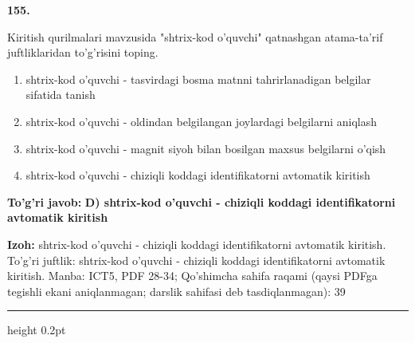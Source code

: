 \documentclass[10pt,a4paper]{article}
\begin{document}
{\bfseries\sffamily\color{ink} 155.}
\par
Kiritish qurilmalari mavzusida "shtrix-kod o'quvchi" qatnashgan atama-ta'rif juftliklaridan to'g'risini toping.
\begin{enumerate}[label=\Alph*),leftmargin=9mm]
\item shtrix-kod o'quvchi - tasvirdagi bosma matnni tahrirlanadigan belgilar sifatida tanish
\item shtrix-kod o'quvchi - oldindan belgilangan joylardagi belgilarni aniqlash
\item shtrix-kod o'quvchi - magnit siyoh bilan bosilgan maxsus belgilarni o'qish
\item shtrix-kod o'quvchi - chiziqli koddagi identifikatorni avtomatik kiritish
\end{enumerate}
\begin{tcolorbox}[enhanced,breakable,colback=teal!4,colframe=teal!60!black,boxrule=0.45pt,arc=1.2mm,left=2.7mm,right=2.7mm,top=1.8mm,bottom=1.8mm,before skip=2mm,after skip=2mm]
{\bfseries\sffamily\color{teal}To'g'ri javob:} \textbf{D) shtrix-kod o'quvchi - chiziqli koddagi identifikatorni avtomatik kiritish}
\par\smallskip
{\bfseries Izoh:} shtrix-kod o'quvchi - chiziqli koddagi identifikatorni avtomatik kiritish. To'g'ri juftlik: shtrix-kod o'quvchi - chiziqli koddagi identifikatorni avtomatik kiritish. Manba: ICT5, PDF 28-34; Qo'shimcha sahifa raqami (qaysi PDFga tegishli ekani aniqlanmagan; darslik sahifasi deb tasdiqlanmagan): 39
\end{tcolorbox}
\vspace{2mm}\hrule height 0.2pt\vspace{3mm}
\end{document}
